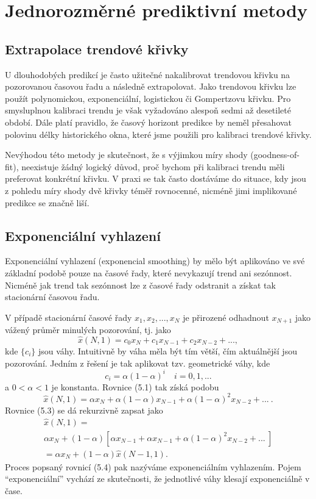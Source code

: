 \section{Jednorozměrné prediktivní metody}

\subsection{Extrapolace trendové křivky}

U dlouhodobých predikcí je často užitečné nakalibrovat trendovou křivku na pozorovanou časovou řadu a následně extrapolovat. Jako trendovou křivku lze použít polynomickou, exponenciální, logistickou či Gompertzovu křivku. Pro smysluplnou kalibraci trendu je však vyžadováno alespoň sedmi až desetileté období. Dále platí pravidlo, že časový horizont predikce by neměl přesahovat polovinu délky historického okna, které jsme použili pro kalibraci trendové křivky.

Nevýhodou této metody je skutečnost, že s výjimkou míry shody (goodness-of-fit), neexistuje žádný logický důvod, proč bychom při kalibraci trendu měli preferovat konkrétní křivku. V praxi se tak často dostáváme do situace, kdy jsou z pohledu míry shody dvě křivky téměř rovnocenné, nicméně jimi implikované predikce se značně liší.

\subsection{Exponenciální vyhlazení}

Exponenciální vyhlazení (exponencial smoothing) by mělo být aplikováno ve své základní podobě pouze na časové řady, které nevykazují trend ani sezónnost. Nicméně jak trend tak sezónnost lze z časové řady odstranit a získat tak stacionární časovou řadu.

V případě stacionární časové řady $x_1, x_2, ..., x_N$ je přirozené odhadnout $x_{N+1}$ jako vážený průměr minulých pozorování, tj. jako
\begin{equation}
\hat{x}(N, 1) = c_0 x_N + c_1 x_{N-1} + c_2 x_{N-2} + ...,
\end{equation}
kde $\{c_i\}$ jsou váhy. Intuitivně by váha měla být tím větší, čím aktuálnější jsou pozorování. Jedním z řešení je tak aplikovat tzv. geometrické váhy, kde
\begin{equation}
c_i = \alpha(1 - \alpha)^i \quad i = 0, 1, ...
\end{equation}
a $0 < \alpha < 1$ je konstanta. Rovnice (5.1) tak získá podobu
\begin{equation}
\hat{x}(N, 1) = \alpha x_N + \alpha(1 - \alpha)x_{N-1} + \alpha(1 - \alpha)^2 x_{N - 2} + ...~.
\end{equation}
Rovnice (5.3) se dá rekurzivně zapsat jako
\begin{multline}
\hat{x}(N, 1) =\\
\alpha x_N + (1 - \alpha)[\alpha x_{N - 1} + \alpha x_{N - 1} + \alpha(1 - \alpha)^2 x_{N-2} + ...~]\\
=\alpha x_N + (1 - \alpha) \hat{x}(N - 1, 1).
\end{multline}
Proces popsaný rovnicí (5.4) pak nazýváme exponenciálním vyhlazením. Pojem ``exponenciální'' vychází ze skutečnosti, že jednotlivé váhy klesají exponenciálně v čase.


